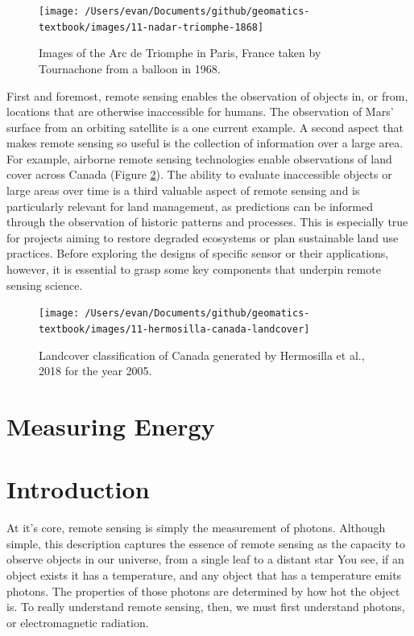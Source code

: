 \documentclass[
]{book}
\begin{document}
\begin{figure}
\texttt{[image: /Users/evan/Documents/github/geomatics-textbook/images/11-nadar-triomphe-1868]} \caption{Images of the Arc de Triomphe in Paris, France taken by Tournachone from a balloon in 1968.}\label{fig:11-nadar}
\end{figure}

First and foremost, remote sensing enables the observation of objects
in, or from, locations that are otherwise inaccessible for humans. The
observation of Mars' surface from an orbiting satellite is a one current
example. A second aspect that makes remote sensing so useful is the
collection of information over a large area. For example, airborne
remote sensing technologies enable observations of land cover across
Canada (Figure \ref{fig:11-hermosilla-canada-landcover}). The ability
to evaluate inaccessible objects or large areas over time is a third
valuable aspect of remote sensing and is particularly relevant for land
management, as predictions can be informed through the observation of
historic patterns and processes. This is especially true for projects
aiming to restore degraded ecosystems or plan sustainable land use
practices. Before exploring the designs of specific sensor or their
applications, however, it is essential to grasp some key components that
underpin remote sensing science.

\begin{figure}
\texttt{[image: /Users/evan/Documents/github/geomatics-textbook/images/11-hermosilla-canada-landcover]} \caption{Landcover classification of Canada generated by Hermosilla et al., 2018 for the year 2005.}\label{fig:11-hermosilla-canada-landcover}
\end{figure}

\hypertarget{measuring-energy}{%
\section{Measuring Energy}\label{measuring-energy}}

\hypertarget{introduction-1}{%
\section{Introduction}\label{introduction-1}}

At it's core, remote sensing is simply the measurement of photons.
Although simple, this description captures the essence of remote
sensing as the capacity to observe objects in our universe, from a single
leaf to a distant star You see, if an object exists it has a
temperature, and any object that has a temperature emits photons. The
properties of those photons are determined by how hot the object is. To
really understand remote sensing, then, we must first understand
photons, or electromagnetic radiation.
\end{document}

